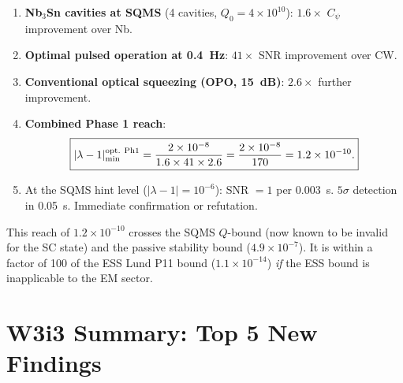 \documentclass[11pt]{article}
\newcommand{\ee}[1]{\times 10^{#1}}
\newcommand{\lam}{\lambda}
\begin{document}
\begin{enumerate}
\item \textbf{Nb$_3$Sn cavities at SQMS} (4 cavities, $Q_0 = 4\ee{10}$): $1.6\times$
$C_\psi$ improvement over Nb.

\item \textbf{Optimal pulsed operation at 0.4~Hz}: $41\times$ SNR improvement over CW.

\item \textbf{Conventional optical squeezing (OPO, 15~dB)}:
$2.6\times$ further improvement.

\item \textbf{Combined Phase 1 reach}:
\begin{equation}
\boxed{|\lam-1|_{\rm min}^{\rm opt.~Ph1}
= \frac{2\ee{-8}}{1.6 \times 41 \times 2.6} = \frac{2\ee{-8}}{170}
= 1.2\ee{-10}.}
\end{equation}

\item At the SQMS hint level ($|\lam-1| = 10^{-6}$): SNR $= 1$ per 0.003~s.
$5\sigma$ detection in 0.05~s. Immediate confirmation or refutation.
\end{enumerate}

This reach of $1.2\ee{-10}$ crosses the SQMS $Q$-bound (now known to be
invalid for the SC state) and the passive stability bound ($4.9\ee{-7}$).
It is within a factor of 100 of the ESS Lund P11 bound ($1.1\ee{-14}$)
\emph{if} the ESS bound is inapplicable to the EM sector.

\section*{W3i3 Summary: Top 5 New Findings}
\end{document}

